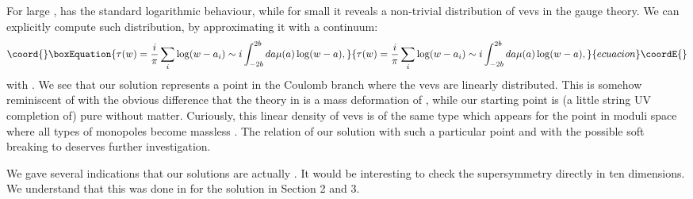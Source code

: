 \documentclass[a4paper,12pt]{article}
\begin{document}
For large \coordHE{}, \coordHE{}  has the standard logarithmic behaviour, while for small \coordHE{} it reveals a non-trivial
distribution of vevs in the gauge theory. We can explicitly compute such distribution, by approximating it 
with a continuum:
\begin{equation}\coord{}\boxEquation{
\tau(w)={i\over\pi}\sum_i \log(w-a_i)\sim i\int_{-2b}^{2b}da\mu (a)\log (w-a),
\label{tau2}
}{
\tau(w)={i\over\pi}\sum_i \log(w-a_i)\sim i\int_{-2b}^{2b}da\mu (a)\log (w-a),
}{ecuacion}\coordE{}\end{equation}
with \coordHE{}. We see that our solution
represents a point in the Coulomb branch where the vevs are
 linearly distributed. This is somehow
reminiscent of \cite{bpp}
with the obvious difference that the theory in \cite{bpp}
is a mass deformation of \coordHE{},  while our starting point is (a little string UV completion of) pure \coordHE{} without matter.
Curiously, this linear density of vevs is of the same type which
appears for the \coordHE{} point in moduli space where all types of
monopoles become massless \cite{ds}. The relation of our 
solution with such a particular point and with the possible
soft breaking to \coordHE{} deserves further investigation.

We gave several indications that our solutions are actually \coordHE{}.
It would be interesting to check the supersymmetry directly
in ten dimensions. We understand that this was done in \cite{martelli} 
for the solution in Section 2 and 3.
\end{document}
